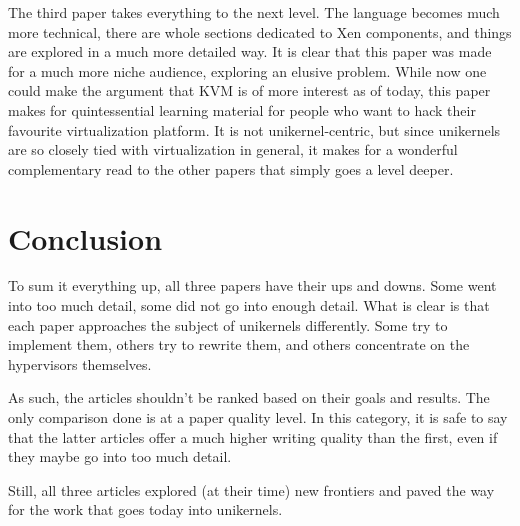 \documentclass[12pt]{article}
\begin{document}
The third paper takes everything to the next level. The language becomes much more technical, there are whole sections dedicated to Xen components,
and things are explored in a much more detailed way. It is clear that this paper was made for a much more niche audience, exploring an elusive problem.
While now one could make the argument that KVM is of more interest as of today, this paper makes for quintessential learning material for people
who want to hack their favourite virtualization platform. It is not unikernel-centric, but since unikernels are so closely tied with virtualization in
general, it makes for a wonderful complementary read to the other papers that simply goes a level deeper.


\section{Conclusion}
To sum it everything up, all three papers have their ups and downs. Some went into too much detail, some did not go into enough detail.
What is clear is that each paper approaches the subject of unikernels differently. Some try to implement them, others try to rewrite them, and
others concentrate on the hypervisors themselves.

As such, the articles shouldn't be ranked based on their goals and results. The only comparison done is at a paper quality level.
In this category, it is safe to say that the latter articles offer a much higher writing quality than the first, even if they maybe go into too
much detail.

Still, all three articles explored (at their time) new frontiers and paved the way for the work that goes today into unikernels.

\printbibliography
\end{document}

